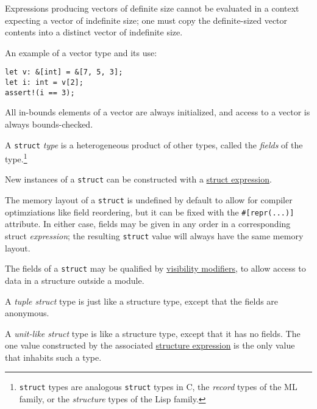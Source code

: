 \documentclass[]{article}
\begin{document}
Expressions producing vectors of definite size cannot be evaluated in a
context expecting a vector of indefinite size; one must copy the
definite-sized vector contents into a distinct vector of indefinite
size.

An example of a vector type and its use:

\begin{verbatim}
let v: &[int] = &[7, 5, 3];
let i: int = v[2];
assert!(i == 3);
\end{verbatim}

All in-bounds elements of a vector are always initialized, and access to
a vector is always bounds-checked.


A \texttt{struct} \emph{type} is a heterogeneous product of other types,
called the \emph{fields} of the type.\footnote{\texttt{struct} types are
  analogous \texttt{struct} types in C, the \emph{record} types of the
  ML family, or the \emph{structure} types of the Lisp family.}

New instances of a \texttt{struct} can be constructed with a
\hyperref[structure-expressions]{struct expression}.

The memory layout of a \texttt{struct} is undefined by default to allow
for compiler optimziations like field reordering, but it can be fixed
with the \texttt{\#{[}repr(...){]}} attribute. In either case, fields
may be given in any order in a corresponding struct \emph{expression};
the resulting \texttt{struct} value will always have the same memory
layout.

The fields of a \texttt{struct} may be qualified by
\hyperref[re-exporting-and-visibility]{visibility modifiers}, to allow
access to data in a structure outside a module.

A \emph{tuple struct} type is just like a structure type, except that
the fields are anonymous.

A \emph{unit-like struct} type is like a structure type, except that it
has no fields. The one value constructed by the associated
\hyperref[structure-expressions]{structure expression} is the only value
that inhabits such a type.

\end{document}
